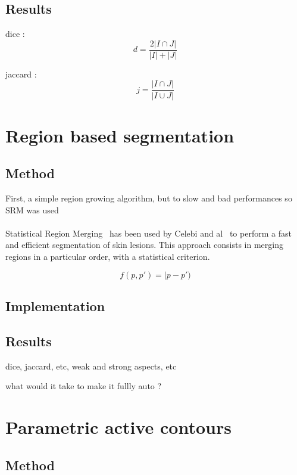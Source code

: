 \documentclass[a4paper,10pt]{article}
\begin{document}
\subsection{Results}

dice :
\begin{equation} \label{eq:dice}
d=\frac{2|I \cap J|}{|I| + |J|} 
\end{equation}

jaccard :
\begin{equation} \label{eq:jaccard}
j=\frac{|I \cap J|}{|I \cup J|} 
\end{equation}

\section{Region based segmentation}
\subsection{Method}
First, a simple region growing algorithm, but to slow and bad performances so SRM was used
\paragraph{} Statistical Region Merging~\cite{nock_statistical_2004} has been 
used by Celebi and al~\cite{celebi_border_2008} to perform a fast and efficient 
segmentation of skin lesions. This approach consists in merging regions in a particular order, with a statistical criterion.

$$
f(p,p')=|p-p')
$$
\subsection{Implementation}

\subsection{Results}
dice, jaccard, etc, weak and strong aspects, etc

what would it take to make it fullly auto ?

\section{Parametric active contours}
\subsection{Method}
\end{document}
